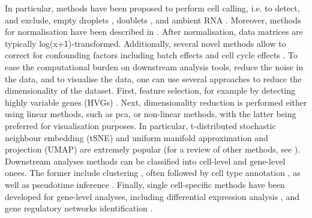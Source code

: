 In particular, methods have been proposed to perform  cell calling, i.e. to detect, and exclude, empty droplets \cite{lun2019emptydrops}, doublets \cite{wolock2019scrublet, mcginnis2019doubletfinder, depasquale2018doubletdecon}, and ambient RNA \cite{young2020soupx}.
Moreover, methods for normalisation have been described in \cite{lun2016pooling, vallejos2017normalizing, weinreb2018spring}.
After normalisation, data matrices are typically log(x+1)‐transformed. 
Additionally, several novel methods allow to correct for confounding factors including batch effects \cite{haghverdi2018batch, butler2018integrating, nowotschin2019emergent, stuart2019comprehensive, welch2019single, polanski2020bbknn} and
cell cycle effects \cite{scialdone2015computational, mcdavid2016reply}.
To ease the computational burden on downstream analysis tools, reduce the noise in the data, and to visualise the data, one can use several approaches to reduce the dimensionality of the dataset.
First, feature selection, for example by detecting highly variable genes (HVGs) \cite{brennecke2013accounting, yip2019evaluation}.
Next, dimensionality reduction is performed either using linear methods, such as \gls{pca}, or non-linear methods, with the latter being preferred for visualisation purposes.
In particular, t-distributed stochastic neighbour embedding (tSNE)  \cite{maaten2008visualizing} and uniform manifold approximation and projection (UMAP) \cite{mcinnes2018umap} are extremely popular (for a review of other methods, see \cite{moon2018manifold}). Downstream analyses methods can be classified into cell-level and gene-level onees.
The former include clustering \cite{kiselev2017sc3, traag2019louvain}, often followed by cell type annotation \cite{kiselev2018scmap}, as well as pseudotime inference \cite{haghverdi2016diffusion, trapnell2014dynamics, bendall2014single, wolf2019paga}.
Finally, single cell-specific methods have been developed for gene-level analyses, including differential expression analysis \cite{finak16others}, and gene regulatory networks identification \cite{matsumoto2017scode, chan2017gene, aibar2017scenic}.\\


